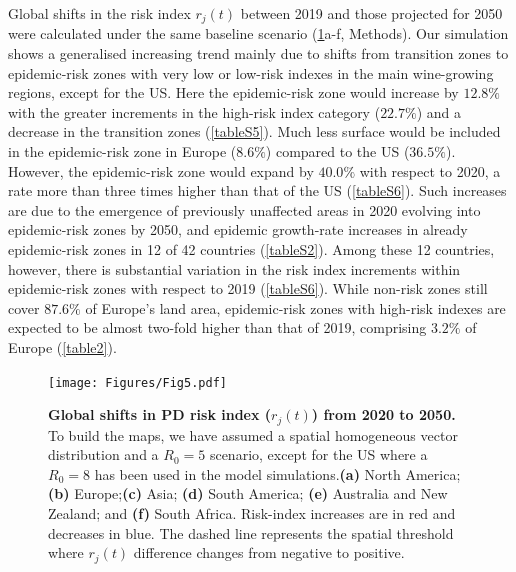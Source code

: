    Global shifts in the risk index $r_j(t)$ between 2019 and those projected
    for 2050 were calculated under the same baseline scenario (\cref{fig5}a-f,
    Methods). Our simulation shows a generalised increasing trend mainly due to
    shifts from transition zones to epidemic-risk zones with very low or
    low-risk indexes in the main wine-growing regions, except for the US. Here
    the epidemic-risk zone would increase by $12.8\%$ with the greater
    increments in the high-risk index category ($22.7\%$) and a decrease in the
    transition zones (\cref{tableS5}). Much less surface would be
    included in the epidemic-risk zone in Europe ($8.6\%$) compared to the US
    ($36.5\%$). However, the epidemic-risk zone would expand by $40.0\%$ with
    respect to 2020, a rate more than three times higher than
    that of the US (\cref{tableS6}). Such increases are due to the
    emergence of previously unaffected areas in 2020 evolving into
    epidemic-risk zones by 2050, and epidemic growth-rate increases in already
    epidemic-risk zones in 12 of 42 countries (\cref{tableS2}). Among
    these 12 countries, however, there is substantial variation in the risk
    index increments within epidemic-risk zones with respect to 2019
    (\cref{tableS6}). While non-risk zones still cover $87.6\%$ of
    Europe's land area, epidemic-risk zones with high-risk indexes are expected
    to be almost two-fold higher than that of 2019, comprising $3.2\%$ of
    Europe (\cref{table2}).

    \begin{figure}[b!]
        \centering
        \texttt{[image: Figures/Fig5.pdf]}
        \caption{\textbf{Global shifts in PD risk index ($r_j(t)$) from 2020 to
                2050.} To build the maps, we have assumed a spatial homogeneous
            vector
            distribution and a $R_0=5$ scenario, except for the US where a
            $R_0=8$ has been
            used in the model simulations.\textbf{(a)} North
            America;\textbf{(b)}
            Europe;\textbf{(c)} Asia; \textbf{(d)} South America; \textbf{(e)}
            Australia
            and New Zealand; and \textbf{(f)} South Africa. Risk-index
            increases are in red
            and decreases in blue. The dashed line represents the spatial
            threshold where
            $r_j(t)$ difference changes from negative to positive.}
        \label{fig5}
    \end{figure}


